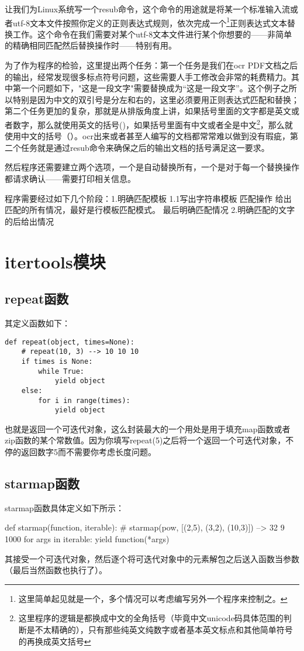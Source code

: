\documentclass[12pt,oneside]{book}
\begin{document}
\begin{common-format}
让我们为Linux系统写一个resub命令，这个命令的用途就是将某一个标准输入流或者utf-8文本文件按照你定义的正则表达式规则，依次完成一个\footnote{这里简单起见就是一个，多个情况可以考虑编写另外一个程序来控制之。}正则表达式文本替换工作。这个命令在我们需要对某个utf-8文本文件进行某个你想要的——非简单的精确相同匹配然后替换操作时——特别有用。

为了作为程序的检验，这里提出两个任务：第一个任务是我们在ocr PDF文档之后的输出，经常发现很多标点符号问题，这些需要人手工修改会非常的耗费精力。其中第一个问题如下，"这是一段文字"需要替换成为“这是一段文字”。这个例子之所以特别是因为中文的双引号是分左和右的，这里必须要用正则表达式匹配和替换；第二个任务更加的复杂，那就是从排版角度上讲，如果括号里面的文字都是英文或者数字，那么就使用英文的括号()，如果括号里面有中文或者全是中文\footnote{这里程序的逻辑是都换成中文的全角括号（毕竟中文unicode码具体范围的判断是不太精确的），只有那些纯英文纯数字或者基本英文标点和其他简单符号的再换成英文括号}，那么就使用中文的括号（）。ocr出来或者甚至人编写的文档都常常难以做到没有瑕疵，第二个任务就是通过resub命令来确保之后的输出文档的括号满足这一要求。

然后程序还需要建立两个选项，一个是自动替换所有，一个是对于每一个替换操作都请求确认——需要打印相关信息。

程序需要经过如下几个阶段：1.明确匹配模板  1.1写出字符串模板 匹配操作 给出匹配的所有情况，最好是行模板匹配模式。  最后明确匹配情况 2.明确匹配的文字的后给出情况 

\chapter{itertools模块}
\label{sec:itertools}
\section{repeat函数}
其定义函数如下：
\begin{Verbatim}
def repeat(object, times=None):
    # repeat(10, 3) --> 10 10 10
    if times is None:
        while True:
            yield object
    else:
        for i in range(times):
            yield object
\end{Verbatim}
也就是返回一个可迭代对象，这么封装最大的一个用处是用于填充map函数或者zip函数的某个常数值。因为你填写repeat(5)之后将一个返回一个可迭代对象，不停的返回数字5而不需要你考虑长度问题。

\section{starmap函数}
starmap函数具体定义如下所示：
\begin{tcbpython}[]
def starmap(function, iterable):
    # starmap(pow, [(2,5), (3,2), (10,3)]) --> 32 9 1000
    for args in iterable:
        yield function(*args)
\end{tcbpython}
其接受一个可迭代对象，然后逐个将可迭代对象中的元素解包之后送入函数当参数（最后当然函数也执行了）。




\end{common-format}
\end{document}
